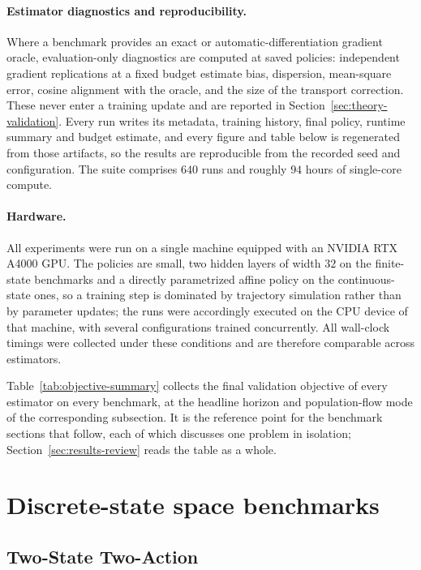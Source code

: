 \paragraph{Estimator diagnostics and reproducibility.}
Where a benchmark provides an exact or automatic-differentiation gradient oracle, evaluation-only diagnostics are computed at saved policies: independent gradient replications at a fixed budget estimate bias, dispersion, mean-square error, cosine alignment with the oracle, and the size of the transport correction. These never enter a training update and are reported in Section~\ref{sec:theory-validation}. Every run writes its metadata, training history, final policy, runtime summary and budget estimate, and every figure and table below is regenerated from those artifacts, so the results are reproducible from the recorded seed and configuration. The suite comprises $640$ runs and roughly $94$ hours of single-core compute.

\paragraph{Hardware.}
All experiments were run on a single machine equipped with an NVIDIA RTX A4000 GPU. The policies are small, two hidden layers of width $32$ on the finite-state benchmarks and a directly parametrized affine policy on the continuous-state ones, so a training step is dominated by trajectory simulation rather than by parameter updates; the runs were accordingly executed on the CPU device of that machine, with several configurations trained concurrently. All wall-clock timings were collected under these conditions and are therefore comparable across estimators.

Table~\ref{tab:objective-summary} collects the final validation objective of every estimator on every benchmark, at the headline horizon and population-flow mode of the corresponding subsection. It is the reference point for the benchmark sections that follow, each of which discusses one problem in isolation; Section~\ref{sec:results-review} reads the table as a whole.



\section{Discrete-state space benchmarks}

\subsection{Two-State Two-Action}
\label{subsec:two-state-two-action}

